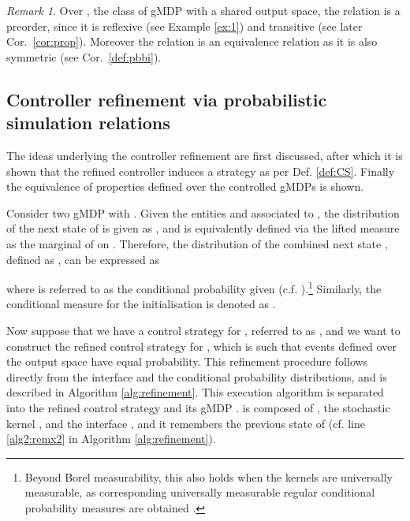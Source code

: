 \documentclass[letterpaper, 10 pt, conference]{amsart}
\theoremstyle{definition}
\theoremstyle{example}
\theoremstyle{remark}
\newtheorem{remark}{Remark}
\begin{document}
\begin{remark} 
Over , 
the class of gMDP with a shared output space, 
the relation  is a preorder, 
since it is reflexive (see Example \ref{ex:1}) and transitive (see later Cor.~\ref{cor:prop}). 
Moreover the relation  is an equivalence relation as it is also symmetric (see Cor.~\ref{def:pbbi}). 
\end{remark} 
\subsection{Controller refinement via probabilistic simulation relations}\label{sec:refine_exact}

The ideas underlying the controller refinement are first discussed,  
after which it is shown that the refined controller induces a strategy as per Def. \ref{def:CS}. 
Finally the equivalence of properties defined over the controlled gMDPs is shown. 

Consider two gMDP   with .
Given the entities  and  associated to , 
the distribution of the next state  of  is given as , 
and is equivalently defined via the lifted measure as the marginal of  on . 
Therefore, the distribution of the combined next state , 
defined as , 
can be expressed as

where  is referred to as the 
conditional probability given  (c.f. \cite[Corollary 3.1.2]{borkar2012probability}).\footnote{ Beyond Borel measurability, this also holds when the kernels are universally measurable, as corresponding universally measurable regular conditional probability measures are obtained \cite{Edalat1999a}.} Similarly, the conditional measure for the initialisation   
 is denoted as 
. 

Now suppose that we have a control strategy for , referred to as , and 
we want to construct the refined control strategy  for ,  
which is such that  
events defined over the output space have equal probability. 
This refinement procedure follows directly from the interface and the conditional probability distributions, 
and is described in Algorithm \ref{alg:refinement}. 
This execution algorithm is separated into the refined control strategy  and its gMDP . 
 is composed of ,  the stochastic kernel , and the interface , 
and it remembers the previous state of  (cf. line \ref{alg2:remx2} in Algorithm \ref{alg:refinement}). \smallskip
\end{document}
